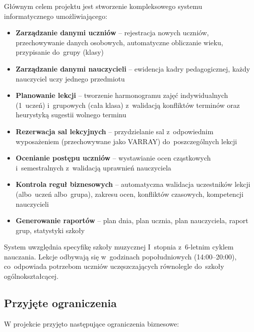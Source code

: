 \documentclass[12pt,a4paper]{article}
\begin{document}
Głównym celem projektu jest stworzenie kompleksowego systemu informatycznego umożliwiającego:

\begin{itemize}
    \item \textbf{Zarządzanie danymi uczniów} -- rejestracja nowych uczniów, przechowywanie danych osobowych, automatyczne obliczanie wieku, przypisanie do~grupy (klasy)

    \item \textbf{Zarządzanie danymi nauczycieli} -- ewidencja kadry pedagogicznej, każdy nauczyciel uczy jednego przedmiotu

    \item \textbf{Planowanie lekcji} -- tworzenie harmonogramu zajęć indywidualnych (1~uczeń) i~grupowych (cała klasa) z~walidacją konfliktów terminów oraz heurystyką sugestii wolnego terminu

    \item \textbf{Rezerwacja sal lekcyjnych} -- przydzielanie sal z~odpowiednim wyposażeniem (przechowywane jako VARRAY) do~poszczególnych lekcji

    \item \textbf{Ocenianie postępu uczniów} -- wystawianie ocen cząstkowych i~semestralnych z~walidacją uprawnień nauczyciela

    \item \textbf{Kontrola reguł biznesowych} -- automatyczna walidacja uczestników lekcji (albo~uczeń albo~grupa), zakresu ocen, konfliktów czasowych, kompetencji nauczycieli

    \item \textbf{Generowanie raportów} -- plan dnia, plan ucznia, plan nauczyciela, raport grup, statystyki szkoły
\end{itemize}

System uwzględnia specyfikę szkoły muzycznej I~stopnia z~6-letnim cyklem nauczania. Lekcje odbywają się w~godzinach popołudniowych (14:00--20:00), co~odpowiada potrzebom uczniów uczęszczających równolegle do~szkoły ogólnokształcącej.

\subsection{Przyjęte ograniczenia}

W projekcie przyjęto następujące ograniczenia biznesowe:
\end{document}
